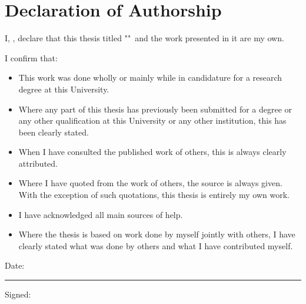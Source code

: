 %
%



\chapter*{Declaration of Authorship}
	
	
\noindent
	I, \textbf{\myName}, declare that this thesis titled "\textit \myTitle "\ and the work presented in it are my own.
	
	\noindent I confirm that:
	\begin{itemize} 
		\item This work was done wholly or mainly while in candidature for a research degree at this University.
		\item Where any part of this thesis has previously been submitted for a degree or any other qualification at this University or any other institution, this has been clearly stated.
		\item When I have consulted the published work of others, this is always clearly attributed.
		\item Where I have quoted from the work of others, the source is always given. With the exception of such quotations, this thesis is entirely my own work.
		\item I have acknowledged all main sources of help.
		\item Where the thesis is based on work done by myself jointly with others, I have clearly stated what was done by others and what I have contributed myself.
	\end{itemize}

\noindent
	Date:\\
	\rule[1em]{15em}{0.3pt} %
	
\noindent
	Signed:\\

\cleardoublepage %